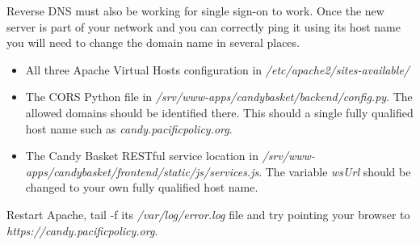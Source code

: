 \documentclass[letterpaper,10pt,english]{sphinxmanual}
\begin{document}
Reverse DNS must also be working for single sign-on to work. Once the
new server is part of your network and you can correctly ping it using
its host name you will need to change the domain name in several
places.
\begin{itemize}
\item {} 
All three Apache Virtual Hosts configuration in
\emph{/etc/apache2/sites-available/}

\item {} 
The CORS Python file in
\emph{/srv/www-apps/candybasket/backend/config.py}. The allowed domains
should be identified there. This should a single fully qualified
host name such as \emph{candy.pacificpolicy.org}.

\item {} 
The Candy Basket RESTful service location in
\emph{/srv/www-apps/candybasket/frontend/static/js/services.js}. The
variable \emph{wsUrl} should be changed to your own fully qualified host
name.

\end{itemize}

Restart Apache, tail -f its \emph{/var/log/error.log} file and try
pointing your browser to \emph{https://candy.pacificpolicy.org}.
\end{document}
